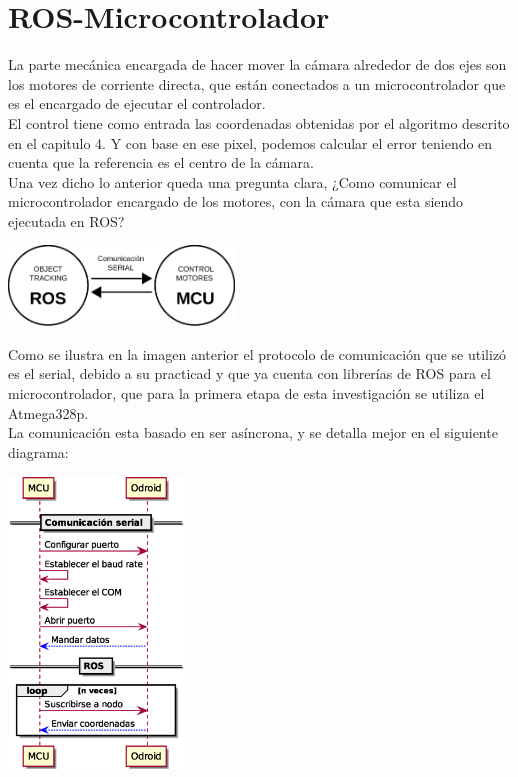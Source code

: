 

\section{ROS-Microcontrolador}
La parte mecánica encargada de hacer mover la cámara alrededor de dos ejes son los motores de corriente directa, que están conectados
a un microcontrolador que es el encargado de ejecutar el controlador.\\
El control tiene como entrada las coordenadas obtenidas por el algoritmo descrito en el capitulo 4. Y con base en ese pixel, podemos
calcular el error teniendo en cuenta que la referencia es el centro de la cámara.\\
Una vez dicho lo anterior queda una pregunta clara, ¿Como comunicar el microcontrolador encargado de los motores, con la cámara que
esta siendo ejecutada en ROS?
\begin{center}
	\includegraphics[width=0.45\textwidth]{Contenido/Cuerpo/Capitulo5/Fig1.eps}
	\label{Fig2}
\end{center}
Como se ilustra en la imagen anterior el protocolo de comunicación que se utilizó es el serial, debido a su practicad y que ya
cuenta con librerías de ROS para el microcontrolador, que para la primera etapa de esta investigación se utiliza el Atmega328p.\\
La comunicación esta basado en ser asíncrona, y se detalla mejor en el siguiente diagrama:
\begin{center}
	\includegraphics[width=0.35\textwidth]{Contenido/Cuerpo/Capitulo5/Fig2.eps}
	\label{Fig3}
\end{center}
